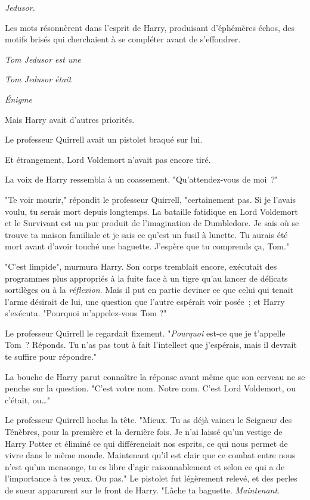 
 \emph{Jedusor.}

\hplettrineextrapara
Les mots résonnèrent dans l'esprit de Harry, produisant d'éphémères échos, des motifs brisés qui cherchaient à se compléter avant de s'effondrer.

\emph{Tom Jedusor est une}

\emph{Tom Jedusor était}

\emph{Énigme}

Mais Harry avait d'autres priorités.

Le professeur Quirrell avait un pistolet braqué sur lui.

Et étrangement, Lord Voldemort n'avait pas encore tiré.

La voix de Harry ressembla à un coassement. "Qu'attendez-vous de moi~?"

"Te voir mourir," répondit le professeur Quirrell, "certainement pas. Si je l'avais voulu, tu serais mort depuis longtemps. La bataille fatidique en Lord Voldemort et le Survivant est un pur produit de l'imagination de Dumbledore. Je sais où se trouve ta maison familiale et je sais ce qu'est un fusil à lunette. Tu aurais été mort avant d'avoir touché une baguette. J'espère que tu comprends ça, Tom."

"C'est limpide", murmura Harry. Son corps tremblait encore, exécutait des programmes plus appropriés à la fuite face à un tigre qu'au lancer de délicats sortilèges ou à la \emph{réflexion}. Mais il put en partie deviner ce que celui qui tenait l'arme désirait de lui, une question que l'autre espérait voir posée~; et Harry s'exécuta. "Pourquoi m'appelez-vous Tom ?"

Le professeur Quirrell le regardait fixement. "\emph{Pourquoi} est-ce que je t'appelle Tom~? Réponds. Tu n'as pas tout à fait l'intellect que j'espérais, mais il devrait te suffire pour répondre."

La bouche de Harry parut connaître la réponse avant même que son cerveau ne se penche sur la question. "C'est votre nom. Notre nom. C'est Lord Voldemort, ou c'était, ou…"

Le professeur Quirrell hocha la tête. "Mieux. Tu as déjà vaincu le Seigneur des Ténèbres, pour la première et la dernière fois. Je n'ai laissé qu'un vestige de Harry Potter et éliminé ce qui différenciait nos esprits, ce qui nous permet de vivre dans le même monde. Maintenant qu'il est clair que ce combat entre nous n'est qu'un mensonge, tu es libre d'agir raisonnablement et selon ce qui a de l'importance à tes yeux. Ou pas." Le pistolet fut légèrement relevé, et des perles de sueur apparurent sur le front de Harry. "Lâche ta baguette. \emph{Maintenant}.

